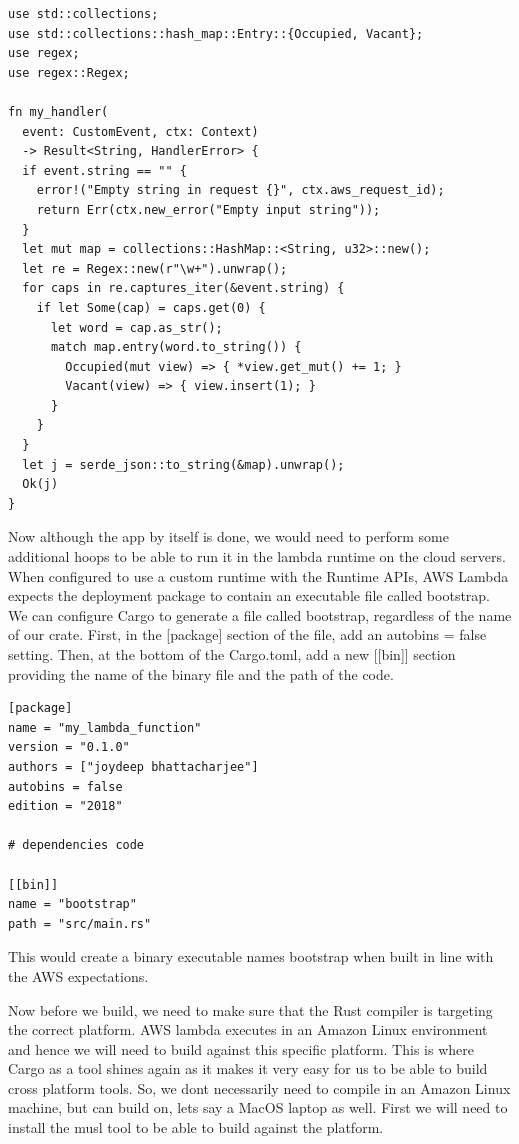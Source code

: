 \documentclass{book}
\begin{document}
\begin{lstlisting}[caption={chapter8/my\_lambda\_function/src/main.rs}, basicstyle=\small]
use std::collections;
use std::collections::hash_map::Entry::{Occupied, Vacant};
use regex;
use regex::Regex;

fn my_handler(
  event: CustomEvent, ctx: Context)
  -> Result<String, HandlerError> {
  if event.string == "" {
    error!("Empty string in request {}", ctx.aws_request_id);
    return Err(ctx.new_error("Empty input string"));
  }
  let mut map = collections::HashMap::<String, u32>::new();
  let re = Regex::new(r"\w+").unwrap();
  for caps in re.captures_iter(&event.string) {
    if let Some(cap) = caps.get(0) {
      let word = cap.as_str();
      match map.entry(word.to_string()) {
        Occupied(mut view) => { *view.get_mut() += 1; }
        Vacant(view) => { view.insert(1); }
      }
    }
  }
  let j = serde_json::to_string(&map).unwrap();
  Ok(j)
}
\end{lstlisting}

Now although the app by itself is done, we would need to perform some additional hoops to be able to run it in the lambda runtime on the cloud servers. When configured to use a custom runtime with the Runtime APIs, AWS Lambda expects the deployment package to contain an executable file called bootstrap. We can configure Cargo to generate a file called bootstrap, regardless of the name of our crate. First, in the [package] section of the file, add an autobins = false setting. Then, at the bottom of the Cargo.toml, add a new [[bin]] section providing the name of the binary file and the path of the code.

\begin{lstlisting}[caption={chapter8/my\_lambda\_function/Cargo.toml}, basicstyle=\small]
[package]
name = "my_lambda_function"
version = "0.1.0"
authors = ["joydeep bhattacharjee"]
autobins = false
edition = "2018"

# dependencies code

[[bin]]
name = "bootstrap"
path = "src/main.rs"
\end{lstlisting}

This would create a binary executable names bootstrap when built in line with the AWS expectations.

Now before we build, we need to make sure that the Rust compiler is targeting the correct platform. AWS lambda executes in an Amazon Linux environment and hence we will need to build against this specific platform. This is where Cargo as a tool shines again as it makes it very easy for us to be able to build cross platform tools. So, we dont necessarily need to compile in an Amazon Linux machine, but can build on, lets say a MacOS laptop as well. First we will need to install the musl tool to be able to build against the platform.
\end{document}
